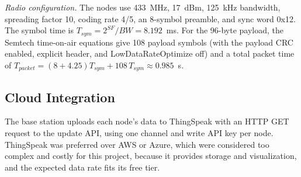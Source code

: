 \textit{Radio configuration.} The nodes use 433~MHz, 17~dBm, 125~kHz bandwidth, spreading factor 10, coding rate 4/5, an 8-symbol preamble, and sync word 0x12. The symbol time is $T_{sym}=2^{SF}/BW=8.192$~ms. For the 96-byte payload, the Semtech time-on-air equations \cite{semtech2020sx1276} give 108 payload symbols (with the payload CRC enabled, explicit header, and LowDataRateOptimize off) and a total packet time of $T_{packet}=(8+4.25)T_{sym}+108\,T_{sym}\approx 0.985$~s.

\subsection{Cloud Integration}
The base station uploads each node's data to ThingSpeak with an HTTP GET request to the update API, using one channel and write API key per node. ThingSpeak was preferred over AWS or Azure, which were considered too complex and costly for this project, because it provides storage and visualization, and the expected data rate fits its free tier.

